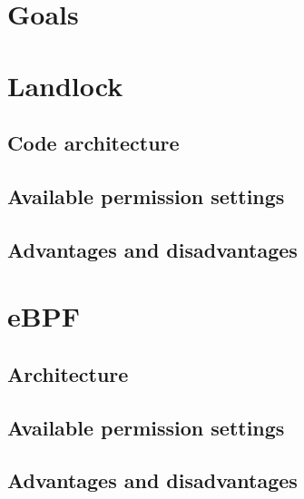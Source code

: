 \section{Goals}

\section{Landlock}

\subsection{Code architecture}

\subsection{Available permission settings}

\subsection{Advantages and disadvantages}

\section{eBPF}

\subsection{Architecture}

\subsection{Available permission settings}

\subsection{Advantages and disadvantages}
